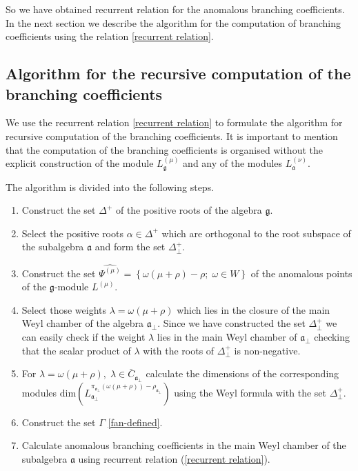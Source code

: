 \documentclass[a4paper,12pt]{article}
\theoremstyle{definition} \newtheorem{Def}{Definition}
\begin{document}
So we have obtained recurrent relation for the anomalous branching coefficients.  In the next section we describe the algorithm for the computation of branching coefficients using the relation \eqref{recurrent relation}. 

\subsection{Algorithm for the recursive computation of the branching coefficients}
\label{sec:algorithm}

We use the recurrent relation \eqref{recurrent relation} to formulate the algorithm for recursive computation of the branching coefficients. It is important to mention that the computation of the branching coefficients is organised without the  explicit construction of the module $L^{(\mu)}_{\mathfrak{g}}$ and any of the modules $L^{(\nu)}_{\mathfrak{a}}$. 

The algorithm is divided into the following steps.
\begin{enumerate}
\item Construct the set $\Delta^{+}$ of the positive roots of the algebra $\mathfrak{g}$.
\item Select the positive roots $\alpha\in \Delta^{+}$ which are orthogonal to the root subspace of the subalgebra $\mathfrak{a}$ and form the set $\Delta^{+}_{\bot}$.
\item Construct the set $\widehat{\Psi^{(\mu)}}=\left\{\omega(\mu+\rho)-\rho;\; \omega\in W\right\}$ of the anomalous points of the $\mathfrak{g}$-module $L^{(\mu)}$.
\item Select those weights $\lambda=\omega(\mu+\rho)$ which lies in the closure of the main Weyl chamber of the algebra $\mathfrak{a}_{\bot}$. Since we have constructed the set $\Delta^{+}_{\bot}$ we can easily check if the weight $\lambda$ lies in the main Weyl chamber of $\mathfrak{a}_{\bot}$ checking that the scalar product of $\lambda$ with the roots of $\Delta^{+}_{\bot}$ is non-negative.
\item For $\lambda=\omega(\mu+\rho),\; \lambda\in \bar{C}_{\mathfrak{a}_{\bot}}$ calculate the dimensions of the corresponding modules $\mathrm{dim}\left(L^{\pi_{\mathfrak{a}_{\bot}}(\omega(\mu+\rho))-\rho_{\mathfrak{a}_{\bot}}}_{\mathfrak{a}_{\bot}}\right)$ using the Weyl formula with the set $\Delta^{+}_{\bot}$.
\item Construct the set $\Gamma$ \eqref{fan-defined}.
\item Calculate anomalous branching coefficients in the main Weyl
  chamber of the subalgebra $\mathfrak{a}$ using recurrent relation (\ref{recurrent relation}).
\end{enumerate}
\end{document}

